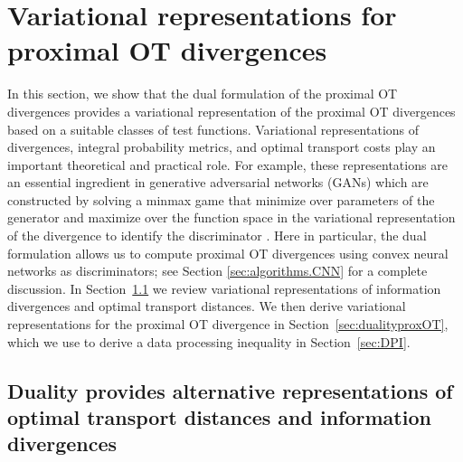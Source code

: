 \documentclass{amsart}
\newcommand{\MK}[1]{\textcolor{orange}{MK: #1}}
\newcommand{\rb}[1]{#1} %
\theoremstyle{definition}
\theoremstyle{remark}
\numberwithin{equation}{section}
\begin{document}
\section{Variational representations for proximal OT divergences}
\label{sec:duality}
In this section, we show that the dual formulation of the proximal OT divergences provides a variational representation of the proximal OT divergences based on a suitable classes of test functions. Variational representations of divergences, integral probability metrics, and optimal transport costs play an important theoretical and practical role. For example, these representations are an essential ingredient in generative adversarial networks
(GANs) which are constructed by solving a minmax game that minimize over parameters of the generator and maximize over the function space in the variational representation of the divergence to identify the discriminator %
\cite{goodfellow2014generative}. 
%
Here in particular, the dual formulation  allows us to compute proximal OT divergences using convex neural networks as discriminators; see Section \ref{sec:algorithms.CNN} for a complete discussion. \rb{In Section~\ref{sec:dual_representations} we review variational representations of information divergences and optimal transport distances. We then derive variational representations for the proximal OT divergence in Section~\ref{sec:dualityproxOT}, which we use to derive a data processing inequality in Section~\ref{sec:DPI}.}


\subsection{Duality provides alternative representations of optimal transport distances and information divergences} \label{sec:dual_representations}
\end{document}

